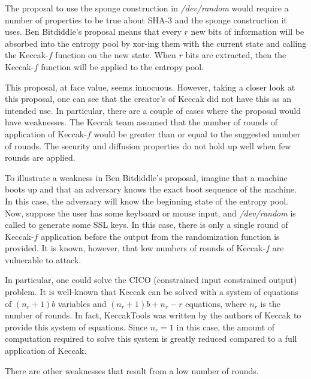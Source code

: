 \documentclass[psamsfonts]{amsart}
\begin{document}
The proposal to use the sponge construction in \emph{/dev/random} would require a number of properties to be true about SHA-3 and the sponge construction it uses. Ben Bitdiddle's proposal means that every $r$ new bits of information will be absorbed into the entropy pool by xor-ing them with the current state and calling the Keccak-$f$ function on the new state. When $r$ bits are extracted, then the Keccak-$f$ function will be applied to the entropy pool.

This proposal, at face value, seems innocuous. However, taking a closer look at this proposal, one can see that the creator's of Keccak did not have this as an intended use. In particular, there are a couple of cases where the proposal would have weaknesses. The Keccak team assumed that the number of rounds of application of Keccak-$f$ would be greater than or equal to the suggested number of rounds. The security and diffusion properties do not hold up well when few rounds are applied.

To illustrate a weakness in Ben Bitdiddle's proposal, imagine that a machine boots up and that an adversary knows the exact boot sequence of the machine. In this case, the adversary will know the beginning state of the entropy pool. Now, suppose the user has some keyboard or mouse input, and \emph{/dev/random} is called to generate some SSL keys. In this case, there is only a single round of Keccak-$f$ application before the output from the randomization function is provided. It is known, however, that low numbers of rounds of Keccak-$f$ are vulnerable to attack.

In particular, one could solve the CICO (constrained input constrained output) problem. It is well-known that Keccak can be solved with a system of equations of $(n_r + 1)b$ variables and $(n_r+1)b + n_r - r$ equations, where $n_r$ is the number of rounds. In fact, KeccakTools was written by the authors of Keccak to provide this system of equations. Since $n_r = 1$ in this case, the amount of computation required to solve this system is greatly reduced compared to a full application of Keccak.

There are other weaknesses that result from a low number of rounds. 
\end{document}

